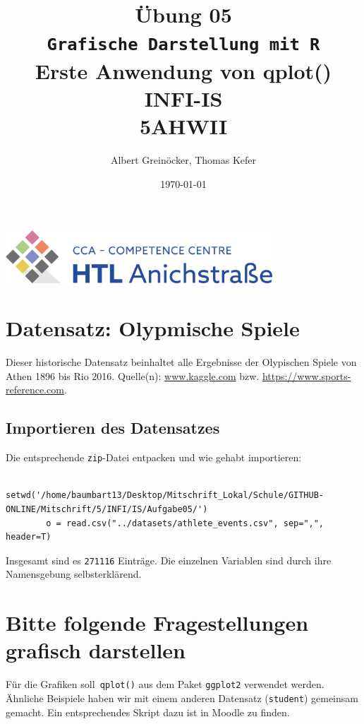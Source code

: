 \documentclass{article}
\title{Übung 05 \\ \texttt{Grafische Darstellung mit R} \\ Erste Anwendung von \textbf{qplot()} \\ INFI-IS \\ 5AHWII}
\date{\today} %
\author{Albert Greinöcker, Thomas Kefer}
\begin{document}
	\maketitle %
	
	\begin{center}
		\includegraphics[width=10cm]{../images/logo.png}
	\end{center}
	\vspace{1cm}
	
	\section{Datensatz: Olypmische Spiele}
	
	Dieser historische Datensatz beinhaltet alle Ergebnisse der Olypischen Spiele von Athen 1896 bis Rio 2016. Quelle(n): \url{www.kaggle.com} bzw. \url{https://www.sports-reference.com}.
	
	
	\subsection{Importieren des Datensatzes}
	
	Die entsprechende \texttt{zip}-Datei entpacken und wie gehabt importieren:
	
	\begin{lstlisting} 
		setwd('/home/baumbart13/Desktop/Mitschrift_Lokal/Schule/GITHUB-ONLINE/Mitschrift/5/INFI/IS/Aufgabe05/')
		o = read.csv("../datasets/athlete_events.csv", sep=",", header=T)
	\end{lstlisting}
	
	Insgesamt sind es \texttt{271116} Einträge. Die einzelnen Variablen sind durch ihre Namensgebung selbsterklärend.
	\newpage
	\section{Bitte folgende Fragestellungen grafisch darstellen}
	
	Für die Grafiken soll\texttt{ qplot()} aus dem Paket \texttt{ggplot2} verwendet werden. Ähnliche Beispiele haben wir mit einem anderen Datensatz (\texttt{student}) gemeinsam gemacht. Ein entsprechendes Skript dazu ist in Moodle zu finden.
	
\end{document}
